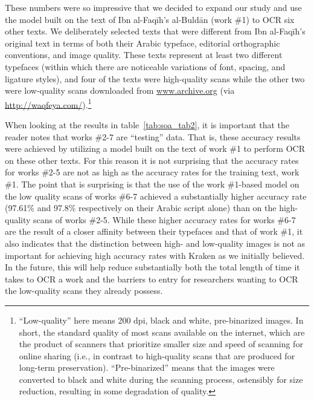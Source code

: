 These numbers were so impressive that we decided to expand our study and use
the model built on the text of Ibn al-Faqīh’s al-Buldān (work \#1) to OCR six
other texts. We deliberately selected texts that were different from Ibn
al-Faqīh’s original text in terms of both their Arabic typeface, editorial
orthographic conventions, and image quality. These texts represent at least two
different typefaces (within which there are noticeable variations of font,
spacing, and ligature styles), and four of the texts were high-quality scans
while the other two were low-quality scans downloaded from
\url{www.archive.org} (via \url{http://waqfeya.com/}).\footnote{“Low-quality”
here means 200 dpi, black and white, pre-binarized images. In short, the
standard quality of most scans available on the internet, which are the product
of scanners that prioritize smaller size and speed of scanning for online
sharing (i.e., in contrast to high-quality scans that are produced for
long-term preservation). “Pre-binarized” means that the  images were converted
to black and white during the scanning process, ostensibly for size reduction,
resulting in some degradation of quality.}

When looking at the results in table~\ref{tab:soa_tab2}, it is important that the reader notes
that works \#2-7 are “testing” data. That is, these accuracy results were
achieved by utilizing a model built on the text of work \#1 to perform OCR on
these other texts. For this reason it is not surprising that the accuracy rates
for works \#2-5 are not as high as the accuracy rates for the training text,
work \#1. The point that is surprising is that the use of the work \#1-based
model on the low quality scans of works \#6-7 achieved a substantially higher
accuracy rate (97.61\% and 97.8\% respectively on their Arabic script alone) than
on the high-quality scans of works \#2-5. While these higher accuracy rates for
works \#6-7 are the result of a closer affinity between their typefaces and that
of work \#1, it also indicates that the distinction between high-  and
low-quality images is not as important for achieving high accuracy rates with
Kraken as we initially believed. In the future, this will help reduce
substantially both the total length of time it takes to OCR a work and the
barriers to entry for researchers wanting to OCR the low-quality scans they
already possess.

